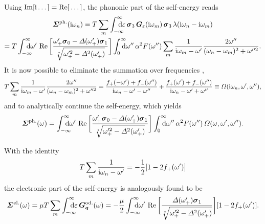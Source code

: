 Using $\operatorname{Im}[\mathrm i \dots] = \operatorname{Re}[\,\dots]$, the phononic part of the self-energy reads
%
\begin{multline*}
    \vec \Sigma \super{ph.} (\I \omega_n)
    = T \sum_m \int \from{-\infty} \till \infty \D \epsilon \,
    \vec \sigma_3 \, \vec G_\epsilon(\I \omega_m) \, \vec \sigma_3 \,
    \lambda(\I \omega_n - \I \omega_m)
    \\
    = T \int \from{-\infty} \till \infty \D \omega' \, \Re \bigg[ \frac
        {\omega'_+ \vec \sigma_0 - \Delta(\omega'_+) \vec \sigma_1}
        {\sqrt[*]{\omega'^2_+ - \Delta^2(\omega'_+)}}
    \bigg]
    \int \from 0 \till \infty \D \omega'' \, \alpha^2 F(\omega'')
    \sum_m \frac 1 {\I \omega_m - \omega'}
    \frac{2 \omega''}{(\omega_n - \omega_m)^2 + \omega''^2}.
\end{multline*}
%
It is now possible to eliminate the summation over  frequencies
\cite[Eqs.~3.40, 3.41]{AllenMitrovic82},
%
\begin{equation*}
    T \sum_m \frac 1 {\mathrm i \omega_m - \omega'}
    \frac{2 \omega''}{(\omega_n - \omega_m)^2 + \omega''^2}
    = \frac{f_+(-\omega') + f_-(\omega'')}{\mathrm i \omega_n - \omega' - \omega''}
    + \frac{f_+( \omega') + f_-(\omega'')}{\mathrm i \omega_n - \omega' + \omega''}
    \equiv \varOmega(\mathrm i \omega_n, \omega', \omega''),
\end{equation*}
%
and to analytically continue the self-energy, which yields
%
\begin{equation*}
    \vec \Sigma \super{ph.} (\omega) =
    \int \from{-\infty} \till \infty \D \omega' \,
    \Re \bigg[ \frac
        {\omega'_+ \vec \sigma_0 - \Delta(\omega'_+) \vec \sigma_1}
        {\sqrt[*]{\omega'^2_+ - \Delta^2(\omega'_+)}}
    \bigg]
    \int \from 0 \till \infty \D \omega'' \, \alpha^2 F(\omega'') \,
    \Omega(\omega, \omega', \omega'').
\end{equation*}

With the identity \cite[Eq.~12.4]{AllenMitrovic82}
%
\begin{equation*}
    T \sum_m \frac 1 {\mathrm i \omega_n - \omega'} = -\frac 1 2 [1 - 2 f_+(\omega')]
\end{equation*}
%
the electronic part of the self-energy is analogously found to be
%
\begin{align*}
    \vec \Sigma \super{el.} (\omega)
    = \mu T \sum_{m} \int \from{-\infty} \till \infty \D \epsilon \,
    \vec G_{\vec q} \super{od.} (\omega)
    = -\frac \mu 2 \int \from{-\infty} \till \infty \D \omega' \,
    \Re \bigg[ \frac
        {\Delta(\omega'_+) \vec \sigma_1}
        {\sqrt[*]{\omega'^2_+ - \Delta^2(\omega'_+)}}
    \bigg] [1 - 2 f_+(\omega')].
\end{align*}

